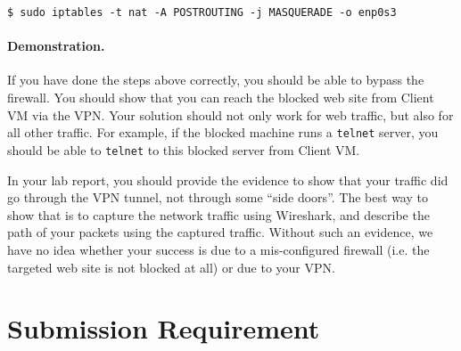     
\begin{lstlisting}
$ sudo iptables -t nat -A POSTROUTING -j MASQUERADE -o enp0s3
\end{lstlisting}
    


\paragraph{Demonstration.}
If you have done the steps above correctly, you should be able to bypass
the firewall. You should show that you can reach the blocked web site from Client VM
via the VPN.  Your solution should
not only work for web traffic, but also for all other traffic. For example, if the blocked
machine runs a \texttt{telnet} server, you should be able to \texttt{telnet} to this blocked server from
Client VM. 

In your lab report, you should provide the evidence to show that your traffic did go through
the VPN tunnel, not through some ``side doors''. The best way to show that is to capture the
network traffic using Wireshark, and describe the path of your packets using the captured
traffic. Without such an evidence, we have no idea whether your success is due to a
mis-configured firewall (i.e. the targeted web site is not blocked at all) or due to your VPN.



\section{Submission Requirement}







